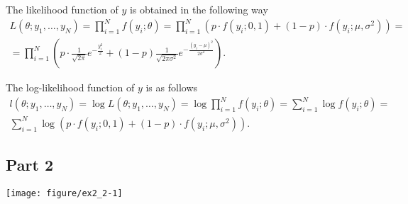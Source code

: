 \documentclass[12pt, a4paper]{article}\usepackage[]{graphicx}\usepackage[]{color}
\makeatletter
\def\maxwidth{ %
  \ifdim\Gin@nat@width>\linewidth
    \linewidth
  \else
    \Gin@nat@width
  \fi
}
\newenvironment{knitrout}{}{} %
\makeatother
\begin{document}
The likelihood function of $y$ is obtained in the following way
\begin{gather*} 
  L(\theta; y_1,\dots,y_N) = \prod_{i=1}^N f(y_i; \theta) = \prod_{i=1}^N  \left(  p\cdot  f(y_i; 0, 1) + (1-p) \cdot  f(y_i; \mu, \sigma^2) \right) = \\
  = \prod_{i=1}^N \left(  p\cdot  \frac{1}{\sqrt{2\pi}} e^{-\frac{y_i^2}{2}} + (1-p)\frac{1}{\sqrt{2\pi\sigma^2}} e^{-\frac{(y_i-\mu)^2}{2\sigma^2}}  \right).
\end{gather*}

The log-likelihood function of $y$ is as follows
\begin{gather*} 
  l(\theta; y_1,\dots,y_N) = \log{L(\theta; y_1,\dots,y_N)} = \log \prod_{i=1}^N f(y_i; \theta) = \sum_{i=1}^N \log f(y_i; \theta) = \\
  \sum_{i=1}^N \log \left(  p\cdot  f(y_i; 0, 1) + (1-p) \cdot  f(y_i; \mu, \sigma^2) \right).
\end{gather*}

\subsection{Part 2}
\begin{knitrout}
\color{fgcolor}

{\centering \texttt{[image: figure/ex2\_2-1]} 

}



\end{knitrout}
\end{document}
